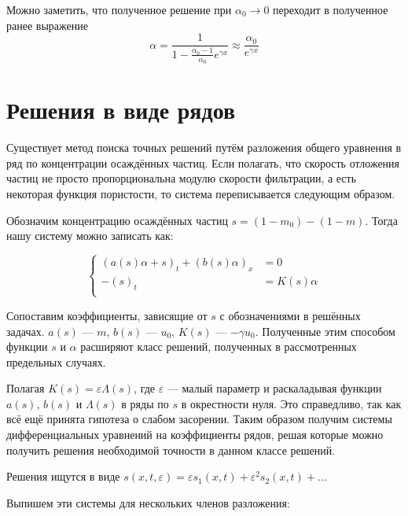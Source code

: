 \documentclass[a4paper,12pt]{article}
\renewcommand{\d}{\displaystyle}
\begin{document}
\par Можно заметить, что полученное решение при $\alpha_{0} \rightarrow 0$ переходит в полученное ранее выражение $$\d \alpha=\frac{1}{1-\frac{\alpha_{0}-1}{\alpha_{0}}e^{\gamma x}}\approx\frac{\alpha_{0}}{e^{\gamma x}}$$
\pagebreak

\section{Решения в виде рядов}
\par Существует метод поиска точных решений путём разложения общего уравнения в ряд по концентрации осаждённых частиц. Если полагать, что скорость отложения частиц не просто пропорциональна  модулю скорости фильтрации, а есть некоторая функция пористости, то система переписывается следующим образом.

\par Обозначим концентрацию осаждённых частиц $s = (1-m_{0})-(1-m)$. Тогда нашу систему можно записать как:

\begin{equation*}
\begin{cases}
(a(s)\alpha+s)_{t}+(b(s)\alpha)_{x}&= 0\\
-(s)_{t}&=K(s)\alpha\\
\end{cases}
\end{equation*}

\par Сопоставим коэффициенты, зависящие от $s$ с обозначениями в решённых задачах. $a(s)$ --- $m$, $b(s)$ --- $u_{0}$, $K(s)$ --- $-\gamma u_{0}$. Полученные этим способом функции $s$ и $\alpha$ расширяют класс решений, полученных в рассмотренных предельных случаях. 

\par Полагая $K(s)=\varepsilon\Lambda(s)$, где $\varepsilon$ --- малый параметр и раскаладывая функции $a(s)$, $b(s)$ и $\Lambda(s)$ в ряды по $s$ в окрестности нуля. Это справедливо, так как всё ещё принята гипотеза о слабом засорении. Таким образом получим системы дифференциальных уравнений на коэффициенты рядов, решая которые можно получить решения необходимой точности в данном классе решений.
\par Решения ищутся в виде $s(x,t,\varepsilon)=\varepsilon s_{1}(x,t)+\varepsilon^{2} s_{2}(x,t)+...$
\par Выпишем эти системы для нескольких членов разложения:
\end{document}

